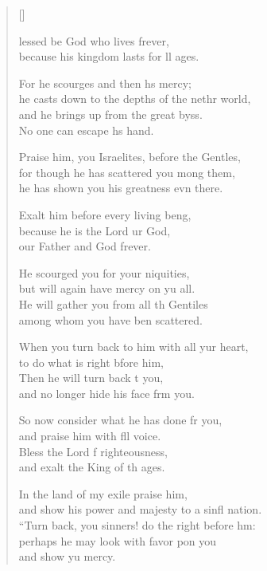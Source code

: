 \settowidth{\versewidth}{“Turn back, you sinners! do the right before him: +}
\begin{verse}[\versewidth]
  \begin{patverse}
    lessed be God who lives frever,\Med\\
    because his kingdom lasts for ll ages.

    For he scourges and then hs mercy;\Med\\
    he casts down to the depths of the nethr world,\\
    and he brings up from the great byss.\Med\\
    No one can escape h\pointup{\i}s hand.

    Praise him, you Israelites, before the Gent\pointup{\i}les,\Flex\\
    for though he has scattered you mong them,\Med\\
    he has shown you his greatness evn there.

    Exalt him before every living be\pointup{\i}ng,\Flex\\
    because he is the Lord ur God,\Med\\
    our Father and God frever.

    He scourged you for your \pointup{\i}niquities,\Med\\
    but will again have mercy on yu all.\\
    He will gather you from all th Gentiles\Med\\
    among whom you have ben scattered.

    When you turn back to him with all yur heart,\Med\\
    to do what is right bfore him,\\
    Then he will turn back t you,\Med\\
    and no longer hide his face frm you.

    So now consider what he has done fr you,\Med\\
    and praise him with fll voice.\\
    Bless the Lord f righteousness,\Med\\
    and exalt the King of th ages.

    In the land of my exile  praise him,\Med\\
    and show his power and majesty to a sinfl nation.\\
    “Turn back, you sinners! do the right before h\pointup{\i}m:\Flex\\
    perhaps he may look with favor pon you\Med\\
    and show yu mercy.


\end{patverse}
\end{verse}
